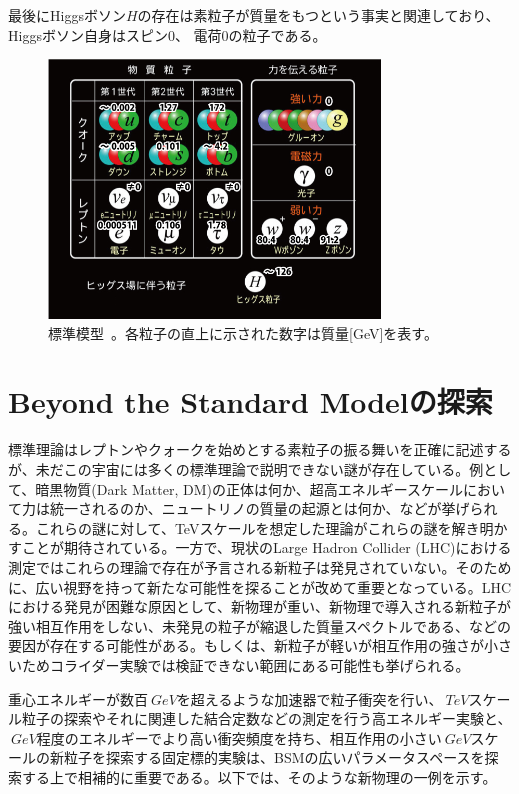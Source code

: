 最後にHiggsボソン$H$の存在は素粒子が質量をもつという事実と関連しており、Higgsボソン自身はスピン0、 電荷0の粒子である。

\begin{figure}[h]
	\begin{center}
		\includegraphics[width=250pt]{./Figure/Introduction/image_01.jpeg}
		\caption[標準模型]{標準模型~\cite{StandardModel}。各粒子の直上に示された数字は質量[GeV]を表す。}
		\label{StandardModel}
	\end{center}
\end{figure}

\section{Beyond the Standard Modelの探索}
標準理論はレプトンやクォークを始めとする素粒子の振る舞いを正確に記述するが、未だこの宇宙には多くの標準理論で説明できない謎が存在している。例として、暗黒物質(Dark Matter, DM)の正体は何か、超高エネルギースケールにおいて力は統一されるのか、ニュートリノの質量の起源とは何か、などが挙げられる。これらの謎に対して、TeVスケールを想定した理論がこれらの謎を解き明かすことが期待されている。一方で、現状のLarge Hadron Collider (LHC)における測定ではこれらの理論で存在が予言される新粒子は発見されていない。そのために、広い視野を持って新たな可能性を探ることが改めて重要となっている。LHCにおける発見が困難な原因として、新物理が重い、新物理で導入される新粒子が強い相互作用をしない、未発見の粒子が縮退した質量スペクトルである、などの要因が存在する可能性がある。もしくは、新粒子が軽いが相互作用の強さが小さいためコライダー実験では検証できない範囲にある可能性も挙げられる。

重心エネルギーが数百$\SI{}{GeV}$を超えるような加速器で粒子衝突を行い、$\SI{}{TeV}$スケール粒子の探索やそれに関連した結合定数などの測定を行う高エネルギー実験と、$\SI{}{GeV}$程度のエネルギーでより高い衝突頻度を持ち、相互作用の小さい$\SI{}{GeV}$スケールの新粒子を探索する固定標的実験は、BSMの広いパラメータスペースを探索する上で相補的に重要である。以下では、そのような新物理の一例を示す。

